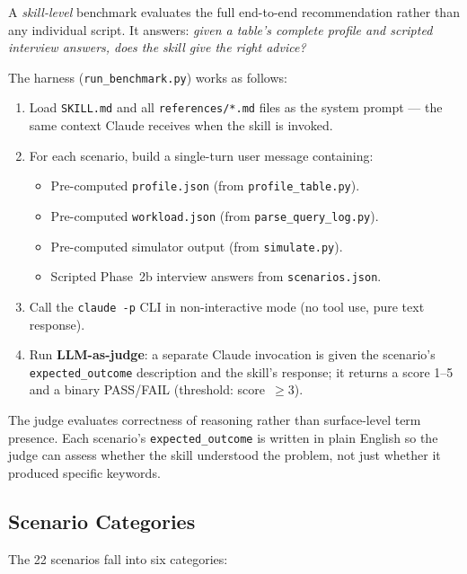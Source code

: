 \documentclass[11pt,a4paper]{article}
\newcommand{\code}[1]{\texttt{#1}}
\begin{document}
A \emph{skill-level} benchmark evaluates the full end-to-end recommendation
rather than any individual script.  It answers: \emph{given a table's complete
profile and scripted interview answers, does the skill give the right advice?}

The harness (\code{run\_benchmark.py}) works as follows:
\begin{enumerate}
  \item Load \code{SKILL.md} and all \code{references/*.md} files as the system
        prompt --- the same context Claude receives when the skill is invoked.
  \item For each scenario, build a single-turn user message containing:
    \begin{itemize}
      \item Pre-computed \code{profile.json} (from \code{profile\_table.py}).
      \item Pre-computed \code{workload.json} (from \code{parse\_query\_log.py}).
      \item Pre-computed simulator output (from \code{simulate.py}).
      \item Scripted Phase~2b interview answers from \code{scenarios.json}.
    \end{itemize}
  \item Call the \code{claude~-p} CLI in non-interactive mode (no tool use,
        pure text response).
  \item Run \textbf{LLM-as-judge}: a separate Claude invocation is given the
        scenario's \code{expected\_outcome} description and the skill's response;
        it returns a score 1--5 and a binary PASS/FAIL (threshold: score~$\geq 3$).
\end{enumerate}

The judge evaluates correctness of reasoning rather than surface-level term
presence.  Each scenario's \code{expected\_outcome} is written in plain English
so the judge can assess whether the skill understood the problem, not just
whether it produced specific keywords.

\subsection{Scenario Categories}

The 22 scenarios fall into six categories:
\end{document}
